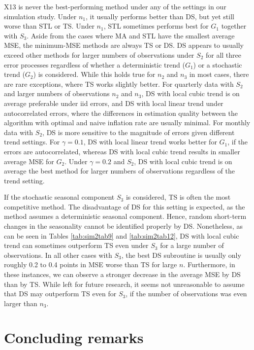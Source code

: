 X13 is never the best-performing method under any of the settings in our simulation study. Under \(n_1\), it usually performs better than DS, but yet still worse than STL or TS. Under \(n_1\), STL sometimes performs best for \(G_1\) together with \(S_3\). Aside from the cases where MA and STL have the smallest average MSE, the minimum-MSE methods are always TS or DS. DS appears to usually exceed other methods for larger numbers of observations under \(S_2\) for all three error processes regardless of whether a deterministic trend (\(G_1\)) or a stochastic trend (\(G_2\)) is considered. While this holds true for \(n_2\) and \(n_3\) in most cases, there are rare exceptions, where TS works slightly better. For quarterly data with \(S_2\) and larger numbers of observations \(n_2\) and \(n_3\), DS with local cubic trend is on average preferable under iid errors, and DS with local linear trend under autocorrelated errors, where the differences in estimation quality between the algorithm with optimal and naive inflation rate are usually minimal. For monthly data with \(S_2\), DS is more sensitive to the magnitude of errors given different trend settings. For \(\gamma = 0.1\), DS with local linear trend works better for \(G_1\), if the errors are autocorrelated, whereas DS with local cubic trend results in smaller average MSE for \(G_2\). Under \(\gamma = 0.2\) and \(S_2\), DS with local cubic trend is on average the best method for larger numbers of observations regardless of the trend setting.

If the stochastic seasonal component \(S_3\) is considered, TS is often the most competitive method. The disadvantage of DS for this setting is expected, as the method assumes a deterministic seasonal component. Hence, random short-term changes in the seasonality cannot be identified properly by DS. Nonetheless, as can be seen in Tables \ref{tab:sim2tab9} and \ref{tab:sim2tab12}, DS with local cubic trend can sometimes outperform TS even under \(S_3\) for a large number of observations. In all other cases with \(S_3\), the best DS subroutine is usually only roughly 0.2 to 0.4 points in MSE worse than TS for large \(n\). Furthermore, in these instances, we can observe a stronger decrease in the average MSE by DS than by TS. While left for future research, it seems not unreasonable to assume that DS may outperform TS even for \(S_3\), if the number of observations was even larger than \(n_3\).

\section{Concluding remarks}\label{sec:conclusion}

